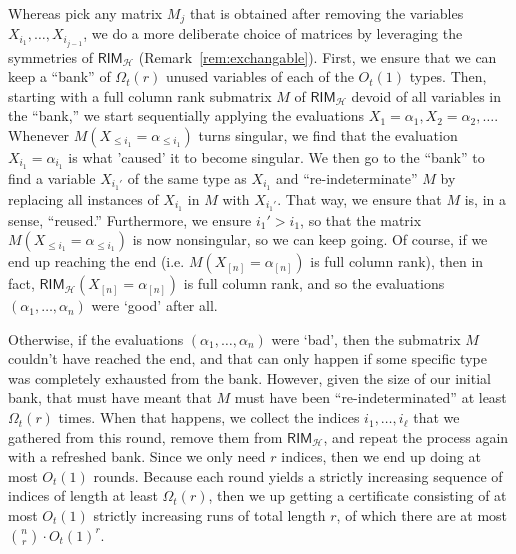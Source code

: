 \documentclass{article}[11pt]
\begin{document}
Whereas \cite{GZ23} pick any matrix $M_j$ that is obtained after removing the variables $X_{i_1}, \ldots , X_{i_{j-1}}$, we do a more deliberate choice of matrices by leveraging the symmetries of $\mathsf{RIM}_{\mathcal{H}}$ (Remark~\ref{rem:exchangable}). First, we ensure that we can keep a ``bank'' of $\Omega_t(r)$ unused variables of each of the $O_t(1)$ types. Then, starting with a full column rank submatrix $M$ of $\mathsf{RIM}_{\mathcal{H}}$ devoid of all variables in the ``bank,'' we start sequentially applying the evaluations $X_1 = \alpha_1, X_2 = \alpha_2, \ldots$. Whenever $M(X_{\le i_1} = \alpha_{\le i_1})$ turns singular, we find that the evaluation $X_{i_1} = \alpha_{i_1}$ is what 'caused' it to become singular. We then go to the ``bank'' to find a variable $X_{i_1'}$ of the same type as $X_{i_1}$ and ``re-indeterminate'' $M$ by replacing all instances of $X_{i_1}$ in $M$ with $X_{i_1'}$. That way, we ensure that $M$ is, in a sense, ``reused.'' Furthermore, we ensure $i_1' > i_1$, so that the matrix $M(X_{\le i_1} = \alpha_{\le i_1})$ is now nonsingular, so we can keep going. Of course, if we end up reaching the end (i.e. $M(X_{[n]} = \alpha_{[n]})$ is full column rank), then in fact, $\mathsf{RIM}_{\mathcal{H}}(X_{[n]} = \alpha_{[n]})$ is full column rank, and so the evaluations $(\alpha_1, \ldots, \alpha_n)$ were `good' after all.

Otherwise, if the evaluations $(\alpha_1, \ldots, \alpha_n)$ were `bad', then the submatrix $M$ couldn't have reached the end, and that can only happen if some specific type was completely exhausted from the bank. However, given the size of our initial bank, that must have meant that $M$ must have been ``re-indeterminated'' at least $\Omega_t(r)$ times. When that happens, we collect the indices $i_1,\dots,i_\ell$ that we gathered from this round, remove them from $\mathsf{RIM}_\mathcal{H}$, and repeat the process again with a refreshed bank. Since we only need $r$ indices, then we end up doing at most $O_t(1)$ rounds. Because each round yields a strictly increasing sequence of indices of length at least $\Omega_t(r)$, then we up getting a certificate consisting of at most $O_t(1)$ strictly increasing runs of total length $r$, of which there are at most $\binom{n}{r}\cdot O_t(1)^r$.
\end{document}
